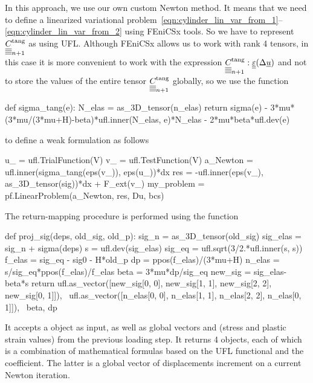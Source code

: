 \documentclass[12pt]{article}
\begin{document}
In this approach, we use our own custom Newton method. It means that we need to define a linearized variational problem~\eqref{eqn:cylinder_lin_var_from_1}--\eqref{eqn:cylinder_lin_var_from_2} using FEniCSx tools. So we have to represent $\underline{\underline{\underline{\underline{C_{}}}}}_{n+1}^\text{tang}$ as  using UFL. Although FEniCSx allows us to work with rank 4 tensors, in this case it is more convenient to work with the expression $\underline{\underline{\underline{\underline{C_{}}}}}_{n+1}^\text{tang} : \underline{\underline{\varepsilon}}(\Delta\underline{u})$ and not to store the values of the entire tensor $\underline{\underline{\underline{\underline{C_{}}}}}_{n+1}^\text{tang}$ globally, so we use the function  
\begin{pythoncode}
    def sigma_tang(e):
    N_elas = as_3D_tensor(n_elas)
    return sigma(e) - 3*mu*(3*mu/(3*mu+H)-beta)*ufl.inner(N_elas, e)*N_elas - 2*mu*beta*ufl.dev(e)  
\end{pythoncode}
to define a weak formulation as follows
\begin{pythoncode}
    u_ = ufl.TrialFunction(V)
    v_ = ufl.TestFunction(V)
    a_Newton = ufl.inner(sigma_tang(eps(v_)), eps(u_))*dx
    res = -ufl.inner(eps(v_), as_3D_tensor(sig))*dx + F_ext(v_)
    my_problem = pf.LinearProblem(a_Newton, res, Du, bcs)
\end{pythoncode}
The return-mapping procedure is performed using the  function
\begin{pythoncode}
    def proj_sig(deps, old_sig, old_p):
        sig_n = as_3D_tensor(old_sig)
        sig_elas = sig_n + sigma(deps)
        s = ufl.dev(sig_elas)
        sig_eq = ufl.sqrt(3/2.*ufl.inner(s, s))
        f_elas = sig_eq - sig0 - H*old_p
        dp = ppos(f_elas)/(3*mu+H)
        n_elas = s/sig_eq*ppos(f_elas)/f_elas
        beta = 3*mu*dp/sig_eq
        new_sig = sig_elas-beta*s
        return ufl.as_vector([new_sig[0, 0], new_sig[1, 1], new_sig[2, 2], new_sig[0, 1]]), \
            ufl.as_vector([n_elas[0, 0], n_elas[1, 1], n_elas[2, 2], n_elas[0, 1]]), \
            beta, dp       
\end{pythoncode}

It accepts a  object  as input, as well as global vectors  and  (stress and plastic strain values) from the previous loading step. It returns 4  objects, each of which is a combination of mathematical formulas based on the UFL functional and the  coefficient. The latter is a global vector of displacements increment on a current Newton iteration.
\end{document}

